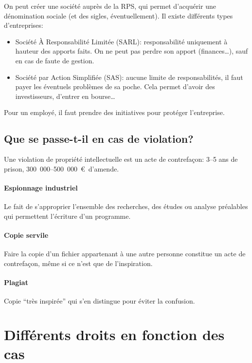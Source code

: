 \documentclass[10pt,a4paper,french]{article}
\begin{document}
On peut créer une société auprès de la RPS, qui permet d'acquérir une dénomination sociale (et des sigles, éventuellement). Il existe différents types d'entreprises:
\begin{itemize}
\item Société À Responsabilité Limitée (SARL): responsabilité uniquement à hauteur des apports faits. On ne peut pas perdre son apport (finances\ldots), sauf en cas de faute de gestion.
\item Société par Action Simplifiée (SAS): aucune limite de responsabilités, il faut payer les éventuels problèmes de sa poche. Cela permet d'avoir des investisseurs, d'entrer en bourse\ldots
\end{itemize}

Pour un employé, il faut prendre des initiatives pour protéger l'entreprise.

\subsection{Que se passe-t-il en cas de violation?}

Une violation de propriété intellectuelle est un acte de contrefaçon: 3--5 ans de prison, 300~000--500~000~\euro~d'amende.

\paragraph{Espionnage industriel}
Le fait de s'approprier l'ensemble des recherches, des études ou analyse préalables qui permettent l'écriture d'un programme.

\paragraph{Copie servile}
Faire la copie d'un fichier appartenant à une autre personne constitue un acte de contrefaçon, même si ce n'est que de l'inspiration.

\paragraph{Plagiat}
Copie ``très inspirée'' qui s'en distingue pour éviter la confusion.

\section{Différents droits en fonction des cas}
\end{document}
